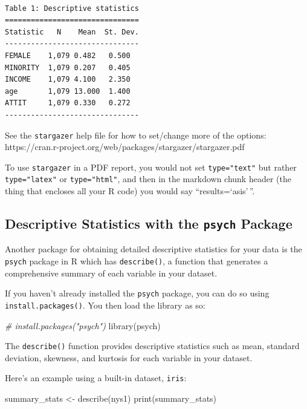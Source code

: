\documentclass[
  letterpaper,
  DIV=11,
  numbers=noendperiod]{scrreprt}
\newenvironment{Shaded}{}{}
\newcommand{\CommentTok}[1]{\textcolor[rgb]{0.38,0.63,0.69}{\textit{#1}}}
\newcommand{\FunctionTok}[1]{\textcolor[rgb]{0.02,0.16,0.49}{#1}}
\newcommand{\NormalTok}[1]{#1}
\newcommand{\OtherTok}[1]{\textcolor[rgb]{0.00,0.44,0.13}{#1}}
\begin{document}
\begin{verbatim}

Table 1: Descriptive statistics
===============================
Statistic   N    Mean  St. Dev.
-------------------------------
FEMALE    1,079 0.482   0.500  
MINORITY  1,079 0.207   0.405  
INCOME    1,079 4.100   2.350  
age       1,079 13.000  1.400  
ATTIT     1,079 0.330   0.272  
-------------------------------
\end{verbatim}

See the \texttt{stargazer} help file for how to set/change more of the
options: https://cran.r-project.org/web/packages/stargazer/stargazer.pdf

To use \texttt{stargazer} in a PDF report, you would not set
\texttt{type="text"} but rather \texttt{type="latex"} or
\texttt{type="html"}, and then in the markdown chunk header (the thing
that encloses all your R code) you would say ``results=`asis'\,''.

\subsection{\texorpdfstring{Descriptive Statistics with the
\texttt{psych}
Package}{Descriptive Statistics with the psych Package}}\label{descriptive-statistics-with-the-psych-package}

Another package for obtaining detailed descriptive statistics for your
data is the \texttt{psych} package in R which has \texttt{describe()}, a
function that generates a comprehensive summary of each variable in your
dataset.

If you haven't already installed the \texttt{psych} package, you can do
so using \texttt{install.packages()}. You then load the library as so:

\begin{Shaded}
\begin{Highlighting}[]
\CommentTok{\# install.packages("psych")}
\FunctionTok{library}\NormalTok{(psych)}
\end{Highlighting}
\end{Shaded}

The \texttt{describe()} function provides descriptive statistics such as
mean, standard deviation, skewness, and kurtosis for each variable in
your dataset.

Here's an example using a built-in dataset, \texttt{iris}:

\begin{Shaded}
\begin{Highlighting}[]
\NormalTok{summary\_stats }\OtherTok{\textless{}{-}} \FunctionTok{describe}\NormalTok{(nys1)}
\FunctionTok{print}\NormalTok{(summary\_stats)}
\end{Highlighting}
\end{Shaded}
\end{document}
